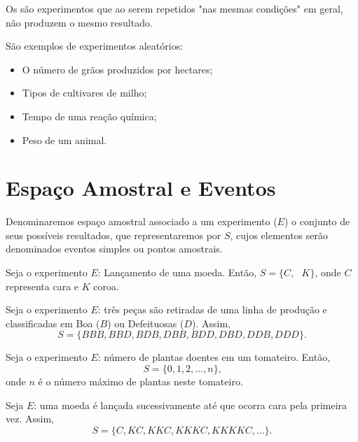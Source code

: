 \documentclass[11pt,fleqn]{book}
\numberwithin{mpicture}{chapter}
\numberwithin{mtable}{chapter}
\numberwithin{mframe}{chapter}
\begin{document}
\begin{definition}
	Os  são experimentos que ao serem repetidos "nas mesmas condições" em geral, não produzem o mesmo resultado.
\end{definition}

\begin{example}
	São exemplos de experimentos aleatórios:
	\begin{itemize}
		\item O número de grãos produzidos por hectares;
		\item Tipos de cultivares de milho;
		\item Tempo de uma reação química;
		\item Peso de um animal.
	\end{itemize}
\end{example}

\section{Espaço Amostral e Eventos}

\begin{definition}
	Denominaremos espaço amostral associado a um experimento ($E$) o conjunto de seus possíveis resultados, que representaremos por $S$, cujos elementos serão denominados eventos simples ou pontos amostrais.
\end{definition}

\begin{example}
	Seja o experimento $E$: Lançamento de uma moeda. Então, $S=\{C,\text{ }K\}$, onde $C$ representa cara e $K$ coroa.
\end{example}

\begin{example}
	\label{example:pecas_boas_defeituosas}
	Seja o experimento $E$: três peças são retiradas de uma linha de produção e classificadas em Boa ($B$) ou Defeituosas ($D$). Assim,
	\[
		S=\{BBB, BBD, BDB, DBB, BDD, DBD, DDB, DDD\}\text{.}
	\]
\end{example}

\begin{example}
	Seja o experimento $E$: número de plantas doentes em um tomateiro. Então,
	\[
		S=\{0, 1, 2, \dots, n\}\text{,}
	\]
	onde $n$ é o número máximo de plantas neste tomateiro.
\end{example}

\begin{example}
	Seja $E$: uma moeda é lançada sucessivamente até que ocorra cara pela primeira vez. Assim,
	\[
		S=\{C, KC, KKC, KKKC, KKKKC, \dots \}\text{.}
	\]
\end{example}
\end{document}

